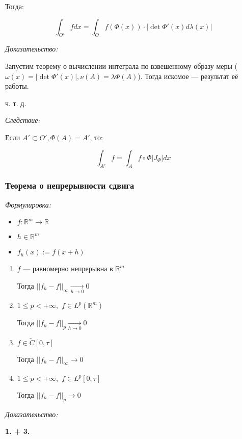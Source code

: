 \documentclass{article}
\def\dbl{\,\,}
\def\rinf{\overline{\mathbb{R}}}
\def\goesto#1{\underset{#1}{\longrightarrow}}
\begin{document}
Тогда:

\[\int_{O'} fdx = \int_{O} f\left(\Phi(x)\right) \cdot |\det \Phi'(x) d\lambda(x)|\]

\textit{Доказательство:}

Запустим теорему о вычислении интеграла по взвешенному образу меры ($\omega(x) = |\det \Phi'(x)|, \nu(A) = \lambda \Phi(A)$). Тогда искомое --- результат её работы.

ч. т. д.

\textit{Следствие:}

Если $A' \subset O', \Phi(A) = A'$, то:

\[\int_{A'} f = \int_{A} f \circ \Phi |J_{\Phi}| dx\]

\subsubsection{Теорема о непрерывности сдвига}
    \textit{Формулировка:}

    \begin{itemize}
        \item $f: \mathbb{R}^{m} \rightarrow \rinf$
        \item $h \in \mathbb{R}^{m}$
        \item $f_{h}(x) := f(x + h)$
    \end{itemize}

    \begin{enumerate}
        \item $f$ --- равномерно непрерывна в $\mathbb{R}^{m}$
        
        Тогда $||f_h - f||_{\infty} \goesto{h \rightarrow 0} 0$

        \item $1 \le p < +\infty, \dbl f \in L^{p}(\mathbb{R}^{m})$
        
        Тогда $||f_h - f||_{p} \goesto{h \rightarrow 0} 0$

        \item $f \in \tilde{C}[0, \tau]$
        
        Тогда $||f_h - f||_{\infty} \goesto{} 0$

        \item $1 \le p < +\infty, \dbl f \in L^{p}[0, \tau]$
        
        Тогда $||f_h - f||_{p} \goesto{} 0$
    \end{enumerate}

    \textit{Доказательство:}

    \textbf{1. + 3.}
\end{document}
